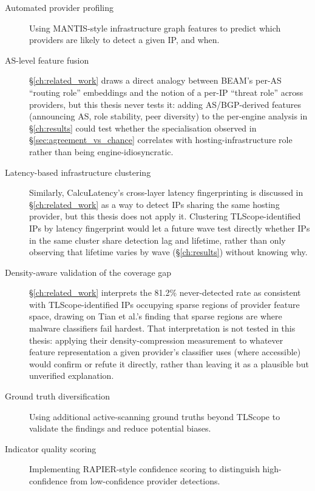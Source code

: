 \documentclass[12pt, a4paper, twoside]{report}
\begin{document}
\begin{description}
  \item[Automated provider profiling] Using MANTIS-style infrastructure graph features
    \cite{deniz2025mantis} to predict which providers are likely to detect a given IP, and when.
  \item[AS-level feature fusion] \S\ref{ch:related_work} draws a direct analogy between BEAM's
    \cite{chen2024beam} per-AS ``routing role'' embeddings and the notion of a per-IP ``threat
    role'' across providers, but this thesis never tests it: adding AS/BGP-derived features
    (announcing AS, role stability, peer diversity) to the per-engine analysis in
    \S\ref{ch:results} could test whether the specialisation observed in
    \S\ref{sec:agreement_vs_chance} correlates with hosting-infrastructure role rather than being
    engine-idiosyncratic.
  \item[Latency-based infrastructure clustering] Similarly, CalcuLatency's \cite{ramesh2024calcuLatency}
    cross-layer latency fingerprinting is discussed in \S\ref{ch:related_work} as a way to detect
    IPs sharing the same hosting provider, but this thesis does not apply it. Clustering
    TLScope-identified IPs by latency fingerprint would let a future wave test directly whether
    IPs in the same cluster share detection lag and lifetime, rather than only observing that
    lifetime varies by wave (\S\ref{ch:results}) without knowing why.
  \item[Density-aware validation of the coverage gap] \S\ref{ch:related_work} interprets the
    81.2\% never-detected rate as consistent with TLScope-identified IPs occupying sparse regions
    of provider feature space, drawing on Tian et al.'s \cite{tian2025density} finding that sparse
    regions are where malware classifiers fail hardest. That interpretation is not tested in this
    thesis: applying their density-compression measurement to whatever feature representation a
    given provider's classifier uses (where accessible) would confirm or refute it directly,
    rather than leaving it as a plausible but unverified explanation.
  \item[Ground truth diversification] Using additional active-scanning ground truths beyond TLScope
    to validate the findings and reduce potential biases.
  \item[Indicator quality scoring] Implementing RAPIER-style \cite{qing2024rapier} confidence
    scoring to distinguish high-confidence from low-confidence provider detections.
\end{description}
\end{document}
